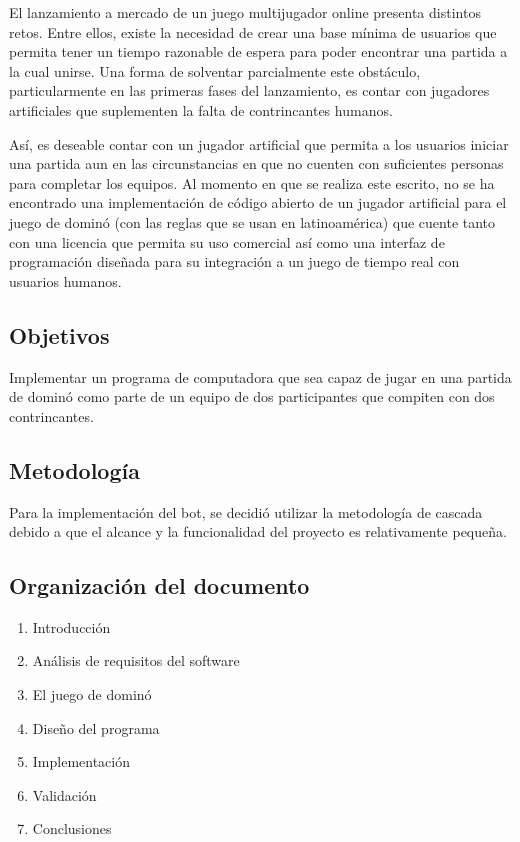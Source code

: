 El lanzamiento a mercado de un juego multijugador online presenta distintos retos. Entre 
ellos, existe la necesidad de crear una base mínima de usuarios que permita tener un tiempo 
razonable de espera para poder encontrar una partida a la cual unirse. Una forma de 
solventar parcialmente este obstáculo, particularmente en las primeras fases del 
lanzamiento, es contar con jugadores artificiales que suplementen la falta de contrincantes 
humanos.

Así, es deseable contar con un jugador artificial que permita a los usuarios iniciar una 
partida aun en las circunstancias en que no cuenten con suficientes personas para completar 
los equipos. Al momento en que se realiza este escrito, no se ha encontrado una 
implementación de código abierto de un jugador artificial para el juego de dominó (con las 
reglas que se usan en latinoamérica) que cuente tanto con una licencia que permita su uso 
comercial así como una interfaz de programación diseñada para su integración a un juego 
de tiempo real con usuarios humanos.



\subsection{Objetivos}

Implementar un programa de computadora que sea capaz de jugar en una partida de dominó 
como parte de un equipo de dos participantes que compiten con dos contrincantes.

\subsection{Metodología}

Para la implementación del bot, se decidió utilizar la metodología de cascada debido a que 
el alcance y la funcionalidad del proyecto es relativamente pequeña.

\subsection{Organización del documento}
\begin{enumerate}
    \item Introducción
    \item Análisis de requisitos del software
    \item El juego de dominó
    \item Diseño del programa
    \item Implementación
    \item Validación
    \item Conclusiones
\end{enumerate}


